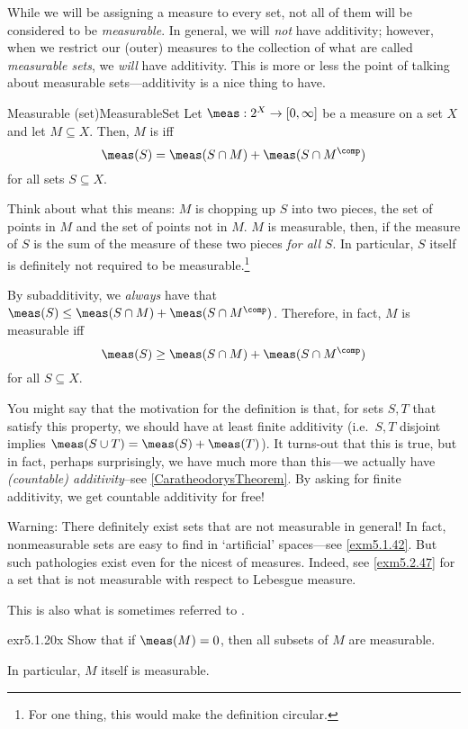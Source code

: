 While we will be assigning a measure to every set, not all of them will be considered to be \emph{measurable}.  In general, we will \emph{not} have additivity; however, when we restrict our (outer) measures to the collection of what are called \emph{measurable sets}, we \emph{will} have additivity.  This is more or less the point of talking about measurable sets---additivity is a nice thing to have.
\begin{dfn}{Measurable (set)}{MeasurableSet}
Let $\meas :2^X\rightarrow [0,\infty ]$ be a measure on a set $X$ and let $M\subseteq X$.  Then, $M$ is  iff
\begin{equation}
\meas (S)=\meas (S\cap M)+\meas (S\cap M^{\comp})
\end{equation}
for all sets $S\subseteq X$.
\begin{rmk}
Think about what this means:  $M$ is chopping up $S$ into two pieces, the set of points in $M$ and the set of points not in $M$.  $M$ is measurable, then, if the measure of $S$ is the sum of the measure of these two pieces \emph{for all} $S$.  In particular, $S$ itself is definitely not required to be measurable.\footnote{For one thing, this would make the definition circular.}
\end{rmk}
\begin{rmk}
By subadditivity, we \emph{always} have that $\meas (S)\leq \meas (S\cap M)+\meas (S\cap M^{\comp})$.  Therefore, in fact, $M$ is measurable iff
\begin{equation}
\meas (S)\geq \meas (S\cap M)+\meas (S\cap M^{\comp})
\end{equation}
for all $S\subseteq X$.
\end{rmk}
\begin{rmk}
You might say that the motivation for the definition is that, for sets $S,T$ that satisfy this property, we should have at least finite additivity (i.e.~$S,T$ disjoint implies $\meas (S\cup T)=\meas (S)+\meas (T)$).  It turns-out that this is true, but in fact, perhaps surprisingly, we have much more than this---we actually have \emph{(countable) additivity}--see \cref{CaratheodorysTheorem}.  By asking for finite additivity, we get countable additivity for free!
\end{rmk}
\begin{wrn}
Warning:  There definitely exist sets that are not measurable in general!  In fact, nonmeasurable sets are easy to find in `artificial' spaces---see \cref{exm5.1.42}.  But such pathologies exist even for the nicest of measures.  Indeed, see \cref{exm5.2.47} for a set that is not measurable with respect to Lebesgue measure.
\end{wrn}
\begin{rmk}
This is also what is sometimes referred to .
\end{rmk}
\end{dfn}
\begin{exr}{}{exr5.1.20x}
Show that if $\meas (M)=0$, then all subsets of $M$ are measurable.
\begin{rmk}
In particular, $M$ itself is measurable.
\end{rmk}
\end{exr}


